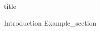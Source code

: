 \documentclass{article}
\begin{document}
{title}
\frontmatter
\tableofcontents
\listoffigures
\mainmatter
{Introduction}
{Example_section}
\end{document}
